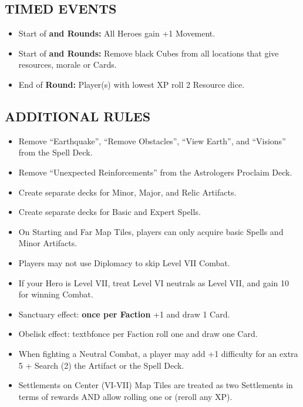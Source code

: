 \begin{multicols*}{2}
\subsection*{\MakeUppercase{Timed Events}}

\begin{itemize}
  \item Start of \textbf{ and  Rounds:} All Heroes gain +1 Movement.
  \item Start of \textbf{ and  Rounds:} Remove black Cubes from all locations that give resources, morale or Cards.
  \item End of \textbf{ Round:} Player(s) with lowest XP roll 2 Resource dice.
\end{itemize}

\subsection*{\MakeUppercase{Additional Rules}}
\begin{itemize}
  \item Remove ``Earthquake'', ``Remove Obstacles'', ``View Earth'', and ``Visions'' from the Spell Deck.
  \item Remove ``Unexpected Reinforcements'' from the Astrologers Proclaim Deck.
  \item Create separate decks for Minor, Major, and Relic Artifacts.
  \item Create separate decks for Basic and Expert Spells.
  \item On Starting and Far Map Tiles, players can only acquire basic Spells and Minor Artifacts.
  \item Players may not use Diplomacy to skip Level VII Combat.
  \item If your Hero is Level VII, treat Level VI neutrals as Level VII, and gain 10  for winning Combat.
  \item Sanctuary effect: \textbf{once per Faction} +1  and draw 1 Card.
  \item Obelisk effect: textbf{once per Faction} roll one  and draw one Card.
  \item When fighting a Neutral Combat, a player may add +1 difficulty for an extra 5  + Search (2) the Artifact or the Spell Deck.
  \item Settlements on Center (VI-VII) Map Tiles are treated as two Settlements in terms of rewards AND allow rolling one  or  (reroll any XP).

\end{itemize}
\end{multicols*}
